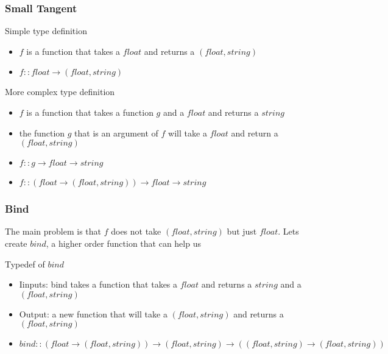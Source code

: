 \begin{frame}[fragile]
    \frametitle{Small Tangent}
    \begin{block}{Simple type definition}
        \begin{itemize}
            \item $f$ is a function that takes a $float$ and returns a $(float, string)$
            \item $f :: float \rightarrow (float, string)$
        \end{itemize}
    \end{block}
    \begin{block}{More complex type definition}
        \begin{itemize}
            \item $f$ is a function that takes a function $g$ and a $float$ and returns a $string$
            \item the function $g$ that is an argument of $f$ will take a $float$ and return a $(float, string)$
            \item $f :: g \rightarrow float \rightarrow string$
            \item $f :: (float \rightarrow (float, string)) \rightarrow float \rightarrow string$
        \end{itemize}
    \end{block}
\end{frame}

\begin{frame}[fragile]
    \frametitle{Bind}
    \begin{block}{}
        The main problem is that $f$ does not take $(float, string)$ but just $float$. Lets create $bind$, a higher
        order function that can help us
    \end{block}
    \begin{block}{Typedef of $bind$}
        \begin{itemize}
            \item Iinputs: bind takes a function that takes a $float$ and returns a $string$ and a $(float, string)$
            \item Output: a new function that will take a $(float, string)$ and returns a $(float, string)$
            \item $bind :: (float \rightarrow (float, string)) \rightarrow (float, string) \rightarrow ((float, string) \rightarrow (float, string))$
        \end{itemize}
    \end{block}
\end{frame}

